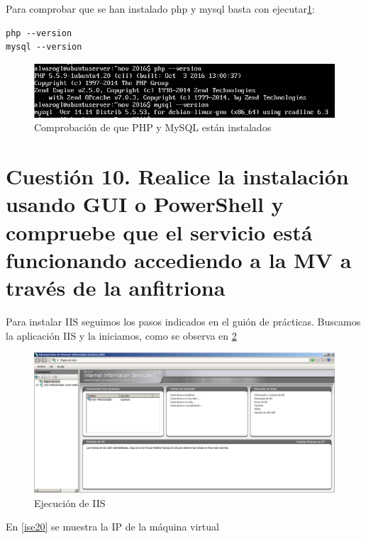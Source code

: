 Para comprobar que se han instalado php y mysql basta con ejecutar\ref{ise17}:

\begin{verbatim}
php --version
mysql --version
\end{verbatim}

\begin{figure}[H]
	\centering
	\includegraphics[scale=0.6]{ise17.png}
	\caption{Comprobación de que PHP y MySQL están instalados} \label{ise17}
\end{figure}

\section{Cuestión 10. Realice la instalación usando GUI o PowerShell y compruebe que el servicio está funcionando accediendo a la MV a través de la anfitriona}

Para instalar IIS seguimos los pasos indicados en el guión de prácticas. Buscamos la aplicación IIS y la iniciamos, como se observa en \ref{ise18} \cite{iis}

\begin{figure}[H]
	\centering
	\includegraphics[scale=0.45]{ise18.png}
	\caption{Ejecución de IIS} \label{ise18}
\end{figure}

En \ref{ise20} se muestra la IP de la máquina virtual

